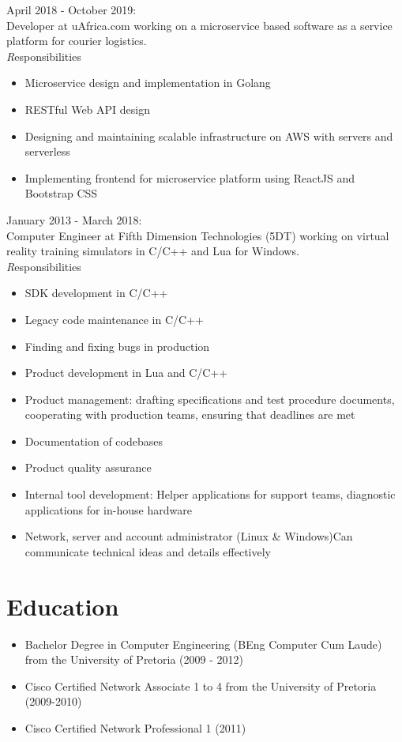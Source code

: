 \documentclass[11pt,a4paper]{article}
\begin{document}
{\noindent\large April 2018 - October 2019:}\\

Developer at uAfrica.com working on a microservice based software as a service platform for courier logistics.
\\

	{\emph Responsibilities}
	\begin{itemize}
	\item Microservice design and implementation in Golang
	\item RESTful Web API design
	\item Designing and maintaining scalable infrastructure on AWS with servers and serverless
	\item Implementing frontend for microservice platform using ReactJS and Bootstrap CSS
	\end{itemize}

{\noindent\large January 2013 - March 2018:}\\

	Computer Engineer at Fifth Dimension Technologies (5DT) working on virtual reality training simulators in C/C++ and Lua for Windows.\\

	
	{\emph Responsibilities}
	\begin{itemize}
		\item SDK development in C/C++
		\item Legacy code maintenance in C/C++
		\item Finding and fixing bugs in production
		\item Product development in Lua and C/C++
		\item Product management: drafting specifications and test procedure documents, cooperating with production teams, ensuring that deadlines are met 
		\item Documentation of codebases
		\item Product quality assurance		
		\item Internal tool development: Helper applications for support teams, diagnostic applications for in-house hardware 
		\item Network, server and account administrator (Linux \& Windows)Can communicate technical ideas and details effectively
	\end{itemize}

\section*{Education}
\begin{itemize}
	\item Bachelor Degree in Computer Engineering (BEng Computer Cum Laude) from the University of Pretoria (2009 - 2012) 
	\item Cisco Certified Network Associate 1 to 4 from the University of Pretoria (2009-2010)
	\item Cisco Certified Network Professional 1 (2011)

\end{itemize}	
	
\end{document}
